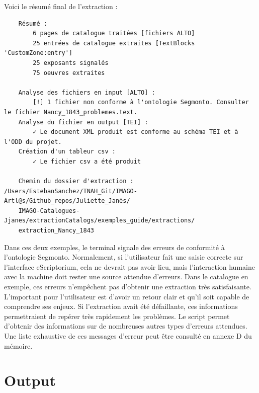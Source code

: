 \documentclass[a4paper,12pt,twoside]{book}
\begin{document}
Voici le résumé final de l'extraction : 
\begin{scriptsize}
	\begin{verbatim}
	Résumé :
		6 pages de catalogue traitées [fichiers ALTO]
		25 entrées de catalogue extraites [TextBlocks 'CustomZone:entry']
		25 exposants signalés
		75 oeuvres extraites

	Analyse des fichiers en input [ALTO] :
		[!] 1 fichier non conforme à l'ontologie Segmonto. Consulter le fichier Nancy_1843_problemes.text.
	Analyse du fichier en output [TEI] :
		✓ Le document XML produit est conforme au schéma TEI et à l'ODD du projet.
	Création d'un tableur csv :
		✓ Le fichier csv a été produit

	Chemin du dossier d'extraction : /Users/EstebanSanchez/TNAH_Git/IMAGO-Artl@s/Github_repos/Juliette_Janès/
	IMAGO-Catalogues-Jjanes/extractionCatalogs/exemples_guide/extractions/
	extraction_Nancy_1843
	\end{verbatim}
\end{scriptsize}\textsl{}

Dans ces deux exemples, le terminal signale des erreurs de conformité à l'ontologie Segmonto. Normalement, si l'utilisateur fait une saisie correcte sur l'interface eScriptorium, cela ne devrait pas avoir lieu, mais l'interaction humaine avec la machine doit rester une source attendue d'erreurs. Dans le catalogue en exemple, ces erreurs n'empêchent pas d'obtenir une extraction très satisfaisante. L'important pour l'utilisateur est d'avoir un retour clair et qu'il soit capable de comprendre ses enjeux. Si l'extraction avait été défaillante, ces informations permettraient de repérer très rapidement les problèmes. Le script permet d'obtenir des informations sur de nombreuses autres types d'erreurs attendues. Une liste exhaustive de ces messages d'erreur peut être consulté en annexe D du mémoire.



\section{Output}
\end{document}
